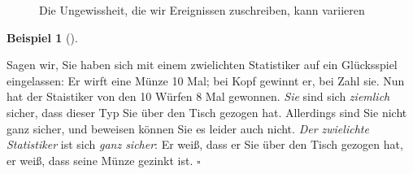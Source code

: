 \documentclass[
  letterpaper,
  oneside,
  open=any]{scrbook}
\theoremstyle{definition}
\theoremstyle{definition}
\newtheorem{example}{Beispiel}[chapter]
\theoremstyle{definition}
\theoremstyle{remark}
\begin{document}
\begin{figure}

\begin{minipage}{0.50\linewidth}



\end{minipage}%
%
\begin{minipage}{0.50\linewidth}



\end{minipage}%

\caption{\label{fig-ungewiss-anna-berta}Die Ungewissheit, die wir
Ereignissen zuschreiben, kann variieren}

\end{figure}%

\begin{example}[]\protect\hypertarget{exm-ungewiss2}{}\label{exm-ungewiss2}

Sagen wir, Sie haben sich mit einem zwielichten Statistiker auf ein
Glücksspiel eingelassen: Er wirft eine Münze 10 Mal; bei Kopf gewinnt
er, bei Zahl sie. Nun hat der Staistiker von den 10 Würfen 8 Mal
gewonnen. \emph{Sie} sind sich \emph{ziemlich} sicher, dass dieser Typ
Sie über den Tisch gezogen hat. Allerdings sind Sie nicht ganz sicher,
und beweisen können Sie es leider auch nicht. \emph{Der zwielichte
Statistiker} ist sich \emph{ganz sicher}: Er weiß, dass er Sie über den
Tisch gezogen hat, er weiß, dass seine Münze gezinkt ist. \(\square\)

\end{example}
\end{document}
